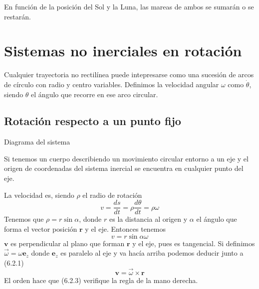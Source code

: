 En función de la posición del Sol y la Luna, las mareas de ambos se sumarán o se restarán.
\section{Sistemas no inerciales en rotación}
Cualquier trayectoria no rectilínea puede intepresarse como una sucesión de arcos de círculo con radio y centro variables. Definimos la velocidad angular $\omega$ como $\dot{\theta}$, siendo $\theta$ el ángulo que recorre en ese arco circular.
\subsection{Rotación respecto a un punto fijo}
\begin{marginfigure}[0pt]
    \def\svgwidth{4 cm}
    \normalsize
	
    \vspace{-30pt}
    \caption{Diagrama del sistema}
\end{marginfigure}
\vspace{15pt}
Si tenemos un cuerpo describiendo un movimiento circular entorno a un eje y el origen de coordenadas del sistema inercial se encuentra en cualquier punto del eje.

La velocidad es, siendo $\rho$ el radio de rotación
\begin{equation} \label{6.1.1}
    v = \frac{ds}{dt} = \rho \frac{d\theta}{dt} = \rho \omega
    \end{equation} 
Tenemos que $\rho = r \sin\alpha$, donde $r$ es la distancia al origen y $\alpha$ el ángulo que forma el vector posición $\mathbf{r}$ y el eje.
Entonces tenemos
\begin{equation} \label{6.1.1}
    v =  r \sin\alpha \omega
    \end{equation} 
$\mathbf{v}$ es perpendicular al plano que forman $\mathbf{r}$ y el eje, pues es tangencial. Si definimos $\vec{\omega}=\omega \mathbf{e}_z$ donde $\mathbf{e}_z$ es paralelo al eje y va hacía arriba podemos deducir junto a (6.2.1)
\begin{equation} \label{6.1.1}
    \mathbf{v} =  \vec{\omega} \times \mathbf{r}
    \end{equation} 
El orden hace que (6.2.3) verifique la regla de la mano derecha.